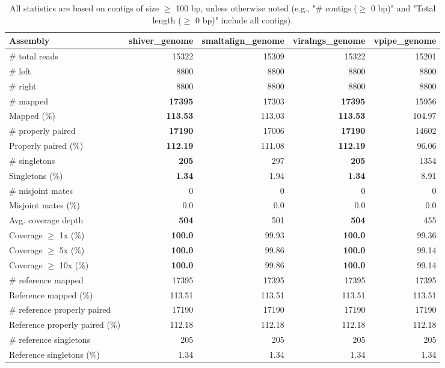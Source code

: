 \documentclass[12pt,a4paper]{article}
\begin{document}
\begin{table}[ht]
\begin{center}
\caption{All statistics are based on contigs of size $\geq$ 100 bp, unless otherwise noted (e.g., "\# contigs ($\geq$ 0 bp)" and "Total length ($\geq$ 0 bp)" include all contigs).}
\begin{tabular}{|l*{4}{|r}|}
\hline
Assembly & shiver\_genome & smaltalign\_genome & viralngs\_genome & vpipe\_genome \\ \hline
\# total reads & 15322 & 15309 & 15322 & 15201 \\ \hline
\# left & 8800 & 8800 & 8800 & 8800 \\ \hline
\# right & 8800 & 8800 & 8800 & 8800 \\ \hline
\# mapped & {\bf 17395} & 17303 & {\bf 17395} & 15956 \\ \hline
Mapped (\%) & {\bf 113.53} & 113.03 & {\bf 113.53} & 104.97 \\ \hline
\# properly paired & {\bf 17190} & 17006 & {\bf 17190} & 14602 \\ \hline
Properly paired (\%) & {\bf 112.19} & 111.08 & {\bf 112.19} & 96.06 \\ \hline
\# singletons & {\bf 205} & 297 & {\bf 205} & 1354 \\ \hline
Singletons (\%) & {\bf 1.34} & 1.94 & {\bf 1.34} & 8.91 \\ \hline
\# misjoint mates & 0 & 0 & 0 & 0 \\ \hline
Misjoint mates (\%) & 0.0 & 0.0 & 0.0 & 0.0 \\ \hline
Avg. coverage depth & {\bf 504} & 501 & {\bf 504} & 455 \\ \hline
Coverage $\geq$ 1x (\%) & {\bf 100.0} & 99.93 & {\bf 100.0} & 99.36 \\ \hline
Coverage $\geq$ 5x (\%) & {\bf 100.0} & 99.86 & {\bf 100.0} & 99.14 \\ \hline
Coverage $\geq$ 10x (\%) & {\bf 100.0} & 99.86 & {\bf 100.0} & 99.14 \\ \hline
\# reference mapped & 17395 & 17395 & 17395 & 17395 \\ \hline
Reference mapped (\%) & 113.51 & 113.51 & 113.51 & 113.51 \\ \hline
\# reference properly paired & 17190 & 17190 & 17190 & 17190 \\ \hline
Reference properly paired (\%) & 112.18 & 112.18 & 112.18 & 112.18 \\ \hline
\# reference singletons & 205 & 205 & 205 & 205 \\ \hline
Reference singletons (\%) & 1.34 & 1.34 & 1.34 & 1.34 \\ \hline

\end{tabular}
\end{center}
\end{table}
\end{document}
